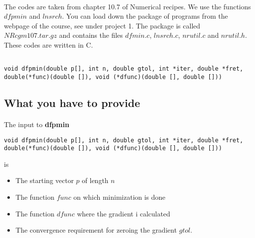 \documentclass[%
twoside,                 %
final,                   %
10pt]{article}
\begin{document}
\paragraph{}
The codes are taken from chapter 10.7 of Numerical recipes.  We use the functions
$dfpmin$ and $lnsrch$.  You can load down the package of programs from the webpage of
the course, see under project 1.  
The package is called $NRcgm107.tar.gz$ and contains the files 
$dfmin.c$, $lnsrch.c$, $nrutil.c$ and $nrutil.h$. 
These codes are  written in C.
\begin{verbatim}

void dfpmin(double p[], int n, double gtol, int *iter, double *fret,
double(*func)(double []), void (*dfunc)(double [], double []))

\end{verbatim}




\subsection*{What you have to provide}

\paragraph{}
The input to \textbf{dfpmin}
\begin{verbatim}
void dfpmin(double p[], int n, double gtol, int *iter, double *fret,
double(*func)(double []), void (*dfunc)(double [], double []))
\end{verbatim}
is

\begin{itemize}
  \item The starting vector $p$ of length $n$

  \item The function $func$ on which minimization is done

  \item The function $dfunc$ where the gradient i calculated

  \item The convergence requirement for zeroing the gradient $gtol$.
\end{itemize}
\end{document}
